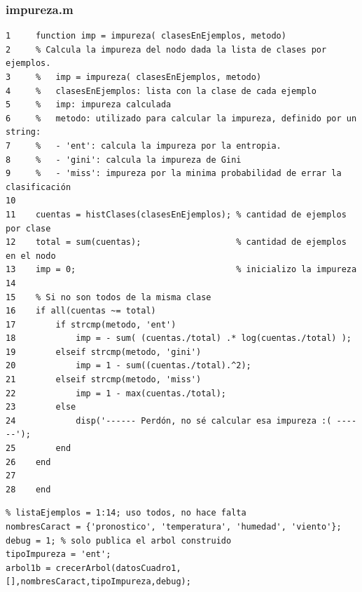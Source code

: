 \documentclass[11pt,a4paper,final]{article}
\begin{document}
\subsubsection*{impureza.m}

\begin{verbatim}
1     function imp = impureza( clasesEnEjemplos, metodo)
2     % Calcula la impureza del nodo dada la lista de clases por ejemplos. 
3     %   imp = impureza( clasesEnEjemplos, metodo)
4     %   clasesEnEjemplos: lista con la clase de cada ejemplo
5     %   imp: impureza calculada
6     %   metodo: utilizado para calcular la impureza, definido por un string:
7     %   - 'ent': calcula la impureza por la entropia.
8     %   - 'gini': calcula la impureza de Gini
9     %   - 'miss': impureza por la minima probabilidad de errar la clasificación
10    
11    cuentas = histClases(clasesEnEjemplos); % cantidad de ejemplos por clase
12    total = sum(cuentas);                   % cantidad de ejemplos en el nodo
13    imp = 0;                                % inicializo la impureza
14    
15    % Si no son todos de la misma clase
16    if all(cuentas ~= total)
17        if strcmp(metodo, 'ent')
18            imp = - sum( (cuentas./total) .* log(cuentas./total) );
19        elseif strcmp(metodo, 'gini')
20            imp = 1 - sum((cuentas./total).^2);
21        elseif strcmp(metodo, 'miss')
22            imp = 1 - max(cuentas./total);
23        else
24            disp('------ Perdón, no sé calcular esa impureza :( ------');
25        end
26    end
27    
28    end
\end{verbatim}

\begin{verbatim}
% listaEjemplos = 1:14; uso todos, no hace falta
nombresCaract = {'pronostico', 'temperatura', 'humedad', 'viento'};
debug = 1; % solo publica el arbol construido
tipoImpureza = 'ent';
arbol1b = crecerArbol(datosCuadro1, [],nombresCaract,tipoImpureza,debug);
\end{verbatim}
\end{document}
